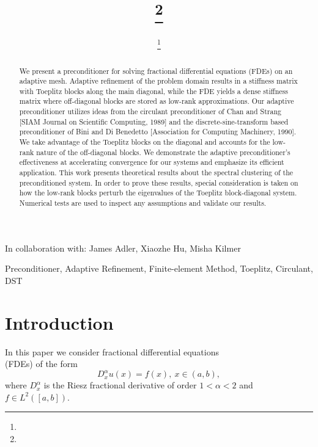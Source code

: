 \documentclass[review]{siamart251216}
\author{\TheName\thanks{\TheAddress}}
\title{{\TheTitle}\thanks{\TheFunding}}
\newcommand{\TheCollaborators}{%
  James Adler,
  Xiaozhe Hu,
  Misha Kilmer
}
\begin{document}
\maketitle

\begin{center}
In collaboration with:
  {\TheCollaborators}
\end{center}
\vspace{1cm}

\begin{abstract}
We present a preconditioner for solving fractional differential equations (FDEs) on an adaptive mesh. Adaptive refinement of the problem domain results in a stiffness matrix with Toeplitz blocks along the main diagonal, while the FDE yields a dense stiffness matrix where off-diagonal blocks are stored as low-rank approximations. Our adaptive preconditioner utilizes ideas from the circulant preconditioner of Chan and Strang [SIAM Journal on Scientific Computing, 1989] and the discrete-sine-transform based preconditioner of Bini and Di Benedetto [Association for Computing Machinery, 1990]. We take advantage of the Toeplitz blocks on the diagonal and accounts for the low-rank nature of the off-diagonal blocks. We demonstrate the adaptive preconditioner's effectiveness at accelerating convergence for our systems and emphasize its efficient application. This work presents theoretical results about the spectral clustering of the preconditioned system. In order to prove these results, special consideration is taken on how the low-rank blocks perturb the eigenvalues of the Toeplitz block-diagonal system. Numerical tests are used to inspect any assumptions and validate our results.
\end{abstract}


\begin{keywords}
  Preconditioner, Adaptive Refinement, Finite-element Method, Toeplitz, Circulant, DST
\end{keywords}


\section{Introduction} 
In this paper we consider fractional differential equations \\ (FDEs) of the form 
\begin{equation}\label{FDE}
	D^{\alpha}_x u(x) = f(x), \ x \in (a,b),
\end{equation}
where $D^{\alpha}_x$ is the Riesz fractional derivative of order $1 < \alpha < 2$ and $f \in L^2([a,b])$. 
\end{document}
